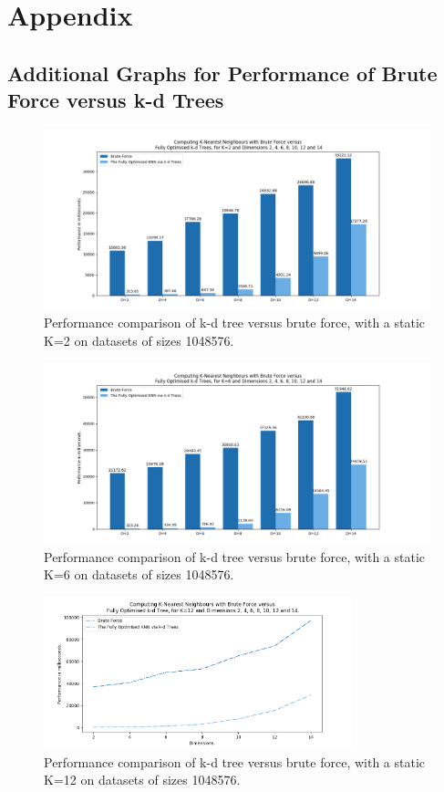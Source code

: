 
\section{Appendix}
\label{sec:appendix}

\subsection{Additional Graphs for Performance of Brute Force versus k-d Trees}

\begin{figure}[H]
\centering
\includegraphics[width=1\textwidth]{pics/plot-figs/brute-mult-k2.png}
\caption{Performance comparison of k-d tree versus brute force, with a static K=2 on datasets of sizes 1048576.}
\label{fig:b1}
\end{figure}


\begin{figure}[H]
\centering
\includegraphics[width=1\textwidth]{pics/plot-figs/brute-mult-k6.png}
\caption{Performance comparison of k-d tree versus brute force, with a static K=6 on datasets of sizes 1048576.}
\label{fig:b2}
\end{figure}


\begin{figure}[H]
\centering
\includegraphics[width=0.8\textwidth]{pics/plot-figs/brute-vs-kdtree.png}
\caption{Performance comparison of k-d tree versus brute force, with a static K=12 on datasets of sizes 1048576.}
\label{fig:b4}
\end{figure}

